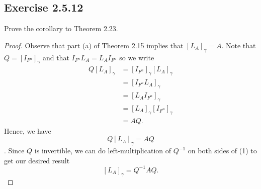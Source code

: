 \subsection*{Exercise 2.5.12} Prove the corollary to Theorem 2.23.
\begin{proof}
Observe that part (a) of Theorem 2.15 implies that \( [{L}_{A}]_{\gamma} = A  \). Note that \( Q = [{I}_{F^{n}}]_{\gamma} \) and that \( {I}_{F^{n}}{L}_{A} = {L}_{A} {I}_{F^{n}}  \) so we write
\begin{align*}
    Q [{L}_{A}]_{\gamma} &= [{I}_{F^{n}}]_{\gamma} [{L}_{A}]_{\gamma}  \\
                         &= [{I}_{F^{n}} {L}_{A}]_{ \gamma} \\
                         &=  [{L}_{A} {I}_{F^{n}}]_{\gamma} \\
                         &=  [{L}_{A}]_{\gamma} [{I}_{F^{n}}]_{\gamma} \\
                         &= AQ.
\end{align*} 
Hence, we have \[ Q [{L}_{A}]_{\gamma} = AQ \tag{1} \]. Since \( Q  \) is invertible, we can do left-multiplication of \( Q^{-1} \) on both sides of (1) to get our desired result
\[  [{L}_{A}]_{\gamma} = Q^{-1} A Q. \]
\end{proof}

